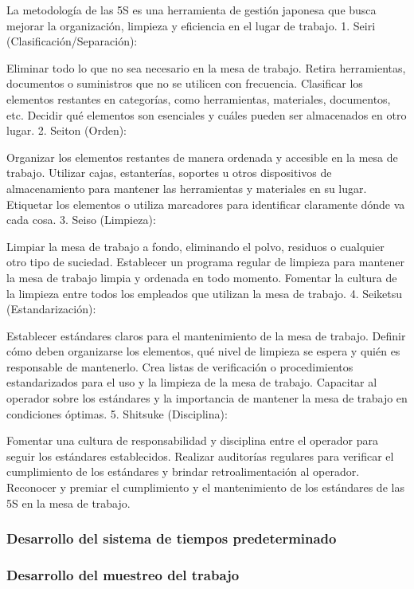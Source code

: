     La metodología de las 5S es una herramienta de gestión japonesa que busca mejorar la organización, limpieza y eficiencia en el lugar de trabajo.
    1. Seiri (Clasificación/Separación):
    
    Eliminar todo lo que no sea necesario en la mesa de trabajo. Retira herramientas, documentos o suministros que no se utilicen con frecuencia.
    Clasificar los elementos restantes en categorías, como herramientas, materiales, documentos, etc.
    Decidir qué elementos son esenciales y cuáles pueden ser almacenados en otro lugar.
    2. Seiton (Orden):
    
    Organizar los elementos restantes de manera ordenada y accesible en la mesa de trabajo.
    Utilizar cajas, estanterías, soportes u otros dispositivos de almacenamiento para mantener las herramientas y materiales en su lugar.
    Etiquetar los elementos o utiliza marcadores para identificar claramente dónde va cada cosa.
    3. Seiso (Limpieza):
    
    Limpiar la mesa de trabajo a fondo, eliminando el polvo, residuos o cualquier otro tipo de suciedad.
    Establecer un programa regular de limpieza para mantener la mesa de trabajo limpia y ordenada en todo momento.
    Fomentar la cultura de la limpieza entre todos los empleados que utilizan la mesa de trabajo.
    4. Seiketsu (Estandarización):
    
    Establecer estándares claros para el mantenimiento de la mesa de trabajo. Definir cómo deben organizarse los elementos, qué nivel de limpieza se espera y quién es responsable de mantenerlo.
    Crea listas de verificación o procedimientos estandarizados para el uso y la limpieza de la mesa de trabajo.
    Capacitar al operador sobre los estándares y la importancia de mantener la mesa de trabajo en condiciones óptimas.
    5. Shitsuke (Disciplina):
    
    Fomentar una cultura de responsabilidad y disciplina entre el operador para seguir los estándares establecidos.
    Realizar auditorías regulares para verificar el cumplimiento de los estándares y brindar retroalimentación al operador.
    Reconocer y premiar el cumplimiento y el mantenimiento de los estándares de las 5S en la mesa de trabajo.
    \subsubsection{Desarrollo del sistema de tiempos predeterminado}
    
    \subsubsection{Desarrollo del muestreo del trabajo}
    
